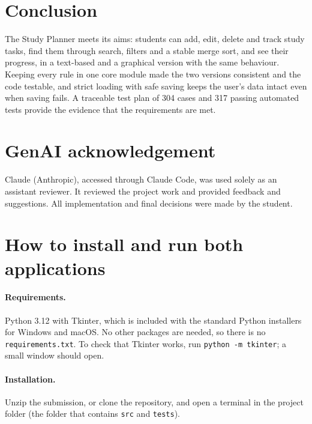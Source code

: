 \documentclass[11pt,a4paper]{article}
\newcommand{\code}[1]{\texttt{#1}}
\begin{document}
\section{Conclusion}
The Study Planner meets its aims: students can add, edit, delete and track
study tasks, find them through search, filters and a stable merge sort, and
see their progress, in a text-based and a graphical version with the same
behaviour. Keeping every rule in one core module made the two versions
consistent and the code testable, and strict loading with safe saving keeps
the user's data intact even when saving fails. A traceable test plan of 304
cases and 317 passing automated tests provide the evidence that the
requirements are met.

\section*{GenAI acknowledgement}
Claude (Anthropic), accessed through Claude Code, was used solely as an assistant reviewer.
It reviewed the project work and provided feedback and suggestions. All implementation
and final decisions were made by the student.

\clearpage
\printbibliography[heading=bibintoc]

\clearpage
\appendix
\section{How to install and run both applications}

\paragraph{Requirements.} Python 3.12 with Tkinter, which is included with the
standard Python installers for Windows and macOS. No other packages are
needed, so there is no \code{requirements.txt}. To check that Tkinter works,
run \code{python -m tkinter}; a small window should open.

\paragraph{Installation.} Unzip the submission, or clone the repository, and
open a terminal in the project folder (the folder that contains \code{src}
and \code{tests}).
\end{document}
